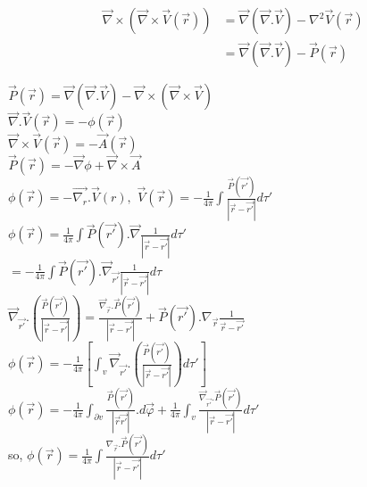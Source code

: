 \documentclass{report}
\begin{document}
\begin{align*}
\vec{\nabla}\times(\vec{\nabla}\times \vec{V}(\vec{r}))&= \vec{\nabla}(\vec{\nabla}.\vec{V})-\nabla^{2}\vec{V}(\vec{r})\\
&=\vec{\nabla}(\vec{\nabla}.\vec{V})-\vec{P}(\vec{r})
\end{align*}

$\vec{P}(\vec{r})=\vec{\nabla}(\vec{\nabla}.\vec{V})-\vec{\nabla}\times
(\vec{\nabla}\times \vec{V})$\\

$\vec{\nabla}.\vec{V}(\vec{r})=-\phi(\vec{r})$\\

$\vec{\nabla}\times\vec{V}(\vec{r})=-\vec{A}(\vec{r})$\\

$\vec{P}(\vec{r})=-\vec{\nabla}\phi+\vec{\nabla}\times\vec{A}$\\

$\phi(\vec{r})=-\vec{\nabla_{r}}.\vec{V}(r),$ \hspace{1cm} $\vec{V}(\vec{r})=-\frac{1}{4 \pi}\int \frac{\vec{P}(\vec{r'})}{|\vec{r}-\vec{r'}|}d\tau'$\\

$\phi(\vec{r})=\frac{1}{4 \pi}\int \vec{P}(\vec{r'}).\vec{\nabla}\frac{1}{|\vec{r}-\vec{r'}|}d \tau'$\\

\hspace{5mm}$=-\frac{1}{4\pi}\int \vec{P}(\vec{r'}).\vec{\nabla}_{\vec{r'}}\frac{1}{|\vec{r}-\vec{r'}|}d \tau$\\

$\vec{\nabla}_{\vec{r'}}.\left(\frac{\vec{P}(\vec{r'})}{|\vec{r}-\vec{r'}|}\right)=\frac{\vec{\nabla}_{\vec{r}}.\vec{P}(\vec{r'})}{|\vec{r}-\vec{r'}|}+\vec{P}(\vec{r'}).\nabla_{\vec{r}}\frac{1}{\vec{r}-\vec{r'}}$\\

$\phi(\vec{r})=-\frac{1}{4\pi}\left[\int_{v}\vec{\nabla}_{\vec{r'}}.\left(\frac{\vec{P}(\vec{r'})}{|\vec{r}-\vec{r'}|}\right) d \tau'\right]$\\

$\phi(\vec{r})=-\frac{1}{4\pi}\int_{\partial v}\frac{\vec{P}(\vec{r'})}{|\vec{r}\vec{r'}|}.d \vec{\varphi}+\frac{1}{4\pi}\int_{v}\frac{\vec{\nabla}_{\vec{r'}}.\vec{P}(\vec{r'})}{|\vec{r}-\vec{r'}|}d \tau'$\\

so, $\phi(\vec{r})=\frac{1}{4\pi}\int\frac{\nabla_{\vec{r}}.\vec{P}(\vec{r'})}{|\vec{r}-\vec{r'}|}d\tau'$\\
\end{document}

